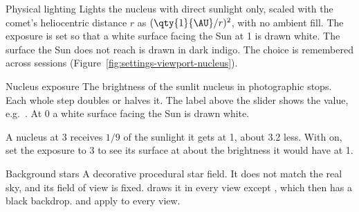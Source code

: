 \begin{uipanel}

\begin{uiproperty}[key=physical-lighting, id=PhysicalLightingToggle, type={check box},
    default={off}, effect=display, saved=prefs, visible={\uilabel{Nucleus} view},
    help=Tabs_Settings_HelpViewPhysicalLighting]{Physical lighting}
Lights the nucleus with direct sunlight only, scaled with the comet's heliocentric distance
$r$ as $(\qty{1}{\AU}/r)^2$, with no ambient fill. The exposure is set so that a white
surface facing the Sun at \qty{1}{\AU} is drawn white. The surface the Sun does not reach is
drawn in dark indigo. The choice is remembered across sessions
(Figure~\ref{fig:settings-viewport-nucleus}).
\end{uiproperty}

\begin{uiproperty}[key=nucleus-exposure, id=NucleusExposureSlider, type={slider},
    unit={\unit{\EV} (stops)}, range={\qty{-4}{\EV} to \qty{+6}{\EV}, step \qty{0.5}{\EV}},
    default={\qty{0}{\EV}}, effect=display, saved=none, %
    visible={\uilabel{Nucleus} and \uilabel{Model} views},
    help=Tabs_Settings_HelpViewNucleusExposure]{Nucleus exposure}
The brightness of the sunlit nucleus in photographic stops. Each whole step doubles or halves
it. The label above the slider shows the value, e.g.\ . At
\qty{0}{\EV} a white surface facing the Sun is drawn white.
\begin{uiexample}
A nucleus at \qty{3}{\AU} receives $1/9$ of the sunlight it gets at \qty{1}{\AU}, about
\qty{3.2}{\EV} less. With  on, set the exposure to
\qty{+3}{\EV} to see its surface at about the brightness it would have at \qty{1}{\AU}.
\end{uiexample}
\end{uiproperty}

\begin{uiproperty}[key=stars, id=StarBackgroundBox, type={drop-down list},
    range={\uilabel{Auto (off in Model view)}, \uilabel{On}, \uilabel{Off}},
    default={\uilabel{Auto (off in Model view)}}, effect=display, saved=prefs,
    help=Tabs_Settings_HelpViewStarBackground]{Background stars}
A decorative procedural star field. It does not match the real sky, and its field of view
is fixed.  draws it in every view except , which then has a
black backdrop.  and  apply to
every view.
\end{uiproperty}


\end{uipanel}
